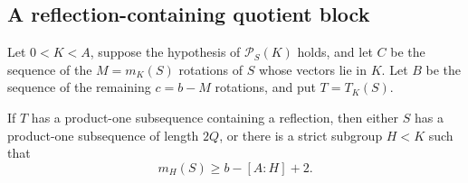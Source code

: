 \subsection{A reflection-containing quotient block}
\label{subsec:reflection-quotient}

Let \(0<K<A\), suppose the hypothesis of \(\mathcal P_S(K)\) holds,
and let \(C\) be the sequence of the \(M=m_K(S)\) rotations of \(S\)
whose vectors lie in \(K\). Let \(B\) be the sequence of the remaining
\(c=b-M\) rotations, and put \(T=T_K(S)\).

\begin{proposition}\label{prop:reflection-quotient}
If \(T\) has a product-one subsequence containing a reflection, then
either \(S\) has a product-one subsequence of length \(2Q\), or there
is a strict subgroup \(H<K\) such that
\[
  m_H(S)\ge b-[A:H]+2.
\]
\end{proposition}

